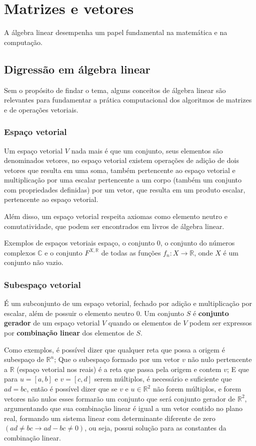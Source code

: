 \section{Matrizes e vetores}

A álgebra linear desempenha um papel fundamental na matemática e na computação.

\subsection{Digressão em álgebra linear}

Sem o propósito de findar o tema, alguns conceitos de álgebra linear são relevantes para fundamentar a prática computacional dos algoritmos de matrizes e de operações vetoriais.

\subsubsection{Espaço vetorial}

Um espaço vetorial $V$ nada mais é que um conjunto, seus elementos são denominados vetores, no espaço vetorial existem operações de adição de dois vetores que resulta em uma soma, também pertencente ao espaço vetorial e multiplicação por uma escalar pertencente a um corpo (também um conjunto com propriedades definidas) por um vetor, que resulta em um produto escalar, pertencente ao espaço vetorial. 

Além disso, um espaço vetorial respeita axiomas como elemento neutro e comutatividade, que podem ser encontrados em livros de álgebra linear.

Exemplos de espaços vetoriais espaço, o conjunto ${0}$, o conjunto do números complexos $\mathbb{C}$ e o conjunto $F^{X,\mathbb{R}}$ de todas as funções $f_n: X \rightarrow \mathbb{R}$, onde $X$ é um conjunto não vazio.

\subsubsection{Subespaço vetorial}

É um subconjunto de um espaço vetorial, fechado por adição e multiplicação por escalar, além de possuir o elemento neutro $0$. Um conjunto $S$ é \textbf{conjunto gerador} de um espaço vetorial $V$ quando os elementos de $V$ podem ser expressos por \textbf{combinação linear} dos elementos de $S$.

Como exemplos, é possível dizer que qualquer reta que possa a origem é subespaço de $\mathbb{R}^n$; Que o subespaço formado por um vetor $v$ não nulo pertencente a $\mathbb{R}$ (espaço vetorial nos reais) é a reta que passa pela origem e contem $v$; E que para $u=[a,b]$ e $v=[c,d]$ serem múltiplos, é necessário e suficiente que $ad=bc$, então é possível dizer que se $v$ e $u\in \mathbb{R}^2$ não forem múltiplos, e forem vetores não nulos esses formarão um conjunto que será conjunto gerador de $\mathbb{R}^2$, argumentando que sua combinação linear é igual a um vetor contido no plano real, formando um sistema linear com determinante diferente de zero $(ad\neq bc \rightarrow ad - bc \neq 0)$, ou seja, possui solução para as constantes da combinação linear.

